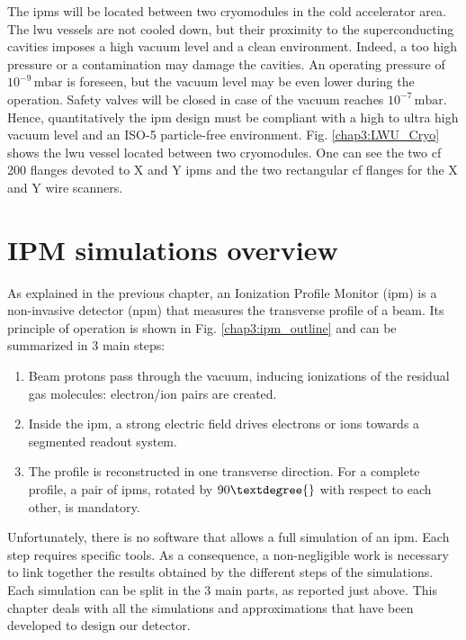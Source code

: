 \begin{refsection}
  The \acrshort{ipm}s will be located between two cryomodules in the cold accelerator area. The \acrshort{lwu} vessels are not cooled down, but their proximity to the superconducting cavities imposes a high vacuum level and a clean environment. Indeed, a too high pressure or a contamination may damage the cavities. An operating pressure of \(10^{-9}\,\mathrm{mbar}\) is foreseen, but the vacuum level may be even lower during the operation. Safety valves will be closed in case of the vacuum reaches \(10^{-7}\,\mathrm{mbar}\). Hence, quantitatively the \acrshort{ipm} design must be compliant with a high to ultra high vacuum level and an ISO-5 \cite{ISO14644} particle-free environment. Fig. \ref{chap3:LWU_Cryo} shows the \acrshort{lwu} vessel located between two cryomodules. One can see the two \acrshort{cf} 200 flanges devoted to X and Y \acrshort{ipm}s and the two rectangular \acrshort{cf} flanges for the X and Y wire scanners.

  \section{IPM simulations overview}

  

  As explained in the previous chapter, an Ionization Profile Monitor (\acrshort{ipm}) is a non-invasive detector (\acrshort{npm}) that measures the transverse profile of a beam.
  Its principle of operation is shown in Fig. \ref{chap3:ipm_outline} and can be summarized in 3 main steps:
  \begin{enumerate}
    \item Beam protons pass through the vacuum, inducing ionizations of the residual gas molecules: electron/ion pairs are created.
    \item Inside the \acrshort{ipm}, a strong electric field drives electrons or ions towards a segmented readout system.
    \item The profile is reconstructed in one transverse direction. For a complete profile, a pair of \acrshort{ipm}s, rotated by $90\textdegree{}$ with respect to each other, is mandatory.
  \end{enumerate}

  Unfortunately, there is no software that allows a full simulation of an \acrshort{ipm}. Each step requires specific tools. As a consequence, a non-negligible work is necessary to link together the results obtained by the different steps of the simulations. Each simulation can be split in the 3 main parts, as reported just above. This chapter deals with all the simulations and approximations that have been developed to design our detector.


\end{refsection}
